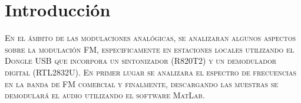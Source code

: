 \section*{Introducción}
\lettrine[lines=2,findent=4pt,nindent=0pt]{E}{\normalfont n el ámbito de las modulaciones analógicas, se analizaran algunos aspectos sobre la modulación FM, especificamente en estaciones locales utilizando el Dongle USB que incorpora un sintonizador (R820T2) y un demodulador digital (RTL2832U). En primer lugar se analizara el espectro de frecuencias en la banda de FM comercial y finalmente, descargando las muestras se demodulará el audio utilizando el software MatLab.}
